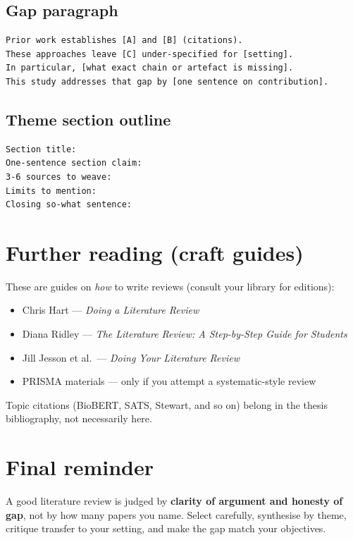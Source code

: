 \documentclass[11pt,a4paper]{article}
\begin{document}
\subsection{Gap paragraph}
\begin{lstlisting}
Prior work establishes [A] and [B] (citations).
These approaches leave [C] under-specified for [setting].
In particular, [what exact chain or artefact is missing].
This study addresses that gap by [one sentence on contribution].
\end{lstlisting}

\subsection{Theme section outline}
\begin{lstlisting}
Section title:
One-sentence section claim:
3-6 sources to weave:
Limits to mention:
Closing so-what sentence:
\end{lstlisting}

\section{Further reading (craft guides)}

These are guides on \emph{how} to write reviews (consult your library for editions):
\begin{itemize}
  \item Chris Hart --- \emph{Doing a Literature Review}
  \item Diana Ridley --- \emph{The Literature Review: A Step-by-Step Guide for Students}
  \item Jill Jesson et al.\ --- \emph{Doing Your Literature Review}
  \item PRISMA materials --- only if you attempt a systematic-style review
\end{itemize}
Topic citations (BioBERT, SATS, Stewart, and so on) belong in the thesis bibliography, not necessarily here.

\section*{Final reminder}
A good literature review is judged by \textbf{clarity of argument and honesty of gap}, not by how many papers you name.
Select carefully, synthesise by theme, critique transfer to your setting, and make the gap match your objectives.
\end{document}
